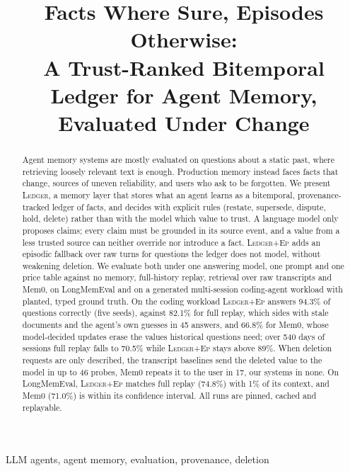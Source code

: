 \documentclass[10pt,conference]{IEEEtran}
\newcommand{\sys}{\textsc{Ledger}}
\newcommand{\hyb}{\textsc{Ledger+Ep}}
\begin{document}
\title{Facts Where Sure, Episodes Otherwise:\\A Trust-Ranked Bitemporal Ledger for Agent Memory, Evaluated Under Change}

\author{}

\maketitle

\begin{abstract}
Agent memory systems are mostly evaluated on questions about a static past,
where retrieving loosely relevant text is enough. Production memory instead
faces facts that change, sources of uneven reliability, and users who ask to
be forgotten. We present \sys{}, a memory layer that stores what an agent
learns as a bitemporal, provenance-tracked ledger of facts, and decides with
explicit rules (restate, supersede, dispute, hold, delete) rather than with
the model which value to trust. A language model only proposes claims; every
claim must be grounded in its source event, and a value from a less trusted
source can neither override nor introduce a fact. \hyb{} adds an episodic
fallback over raw turns for questions the ledger does not model, without
weakening deletion. We evaluate both under one answering model, one prompt and
one price table against no memory, full-history replay, retrieval over raw
transcripts and Mem0, on LongMemEval and on a generated multi-session
coding-agent workload with planted, typed ground truth. On the coding workload
\hyb{} answers 94.3\% of questions correctly (five seeds), against 82.1\% for
full replay, which sides with stale documents and the agent's own guesses in
45 answers, and 66.8\% for Mem0, whose model-decided updates erase the values
historical questions need; over 540 days of sessions full replay falls to 70.5\% while \hyb{}
stays above 89\%. When deletion requests are only described, the transcript
baselines send the deleted value to the model in up to 46 probes, Mem0 repeats
it to the user in 17, our systems in none. On LongMemEval, \hyb{} matches full replay (74.8\%) with 1\% of its
context, and Mem0 (71.0\%) is within its confidence interval. All runs are pinned, cached and replayable.
\end{abstract}

\begin{IEEEkeywords}
LLM agents, agent memory, evaluation, provenance, deletion
\end{IEEEkeywords}
\end{document}
